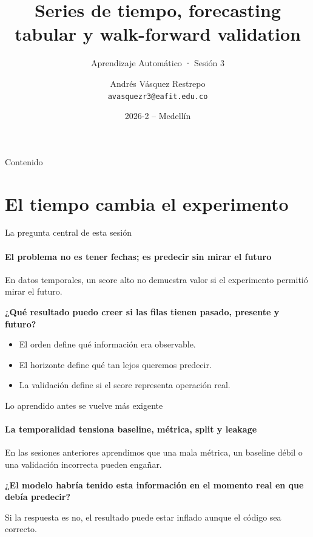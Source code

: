 \documentclass[aspectratio=169,11pt]{beamer}  %
\title[Series de tiempo, forecasting tabular y walk-forward validation]{Series de tiempo, forecasting tabular y walk-forward validation}
\subtitle{Aprendizaje Automático · Sesión 3}
\author[Aprendizaje Automático]{Andrés Vásquez Restrepo\\[2pt]{\normalfont\small\texttt{avasquezr3@eafit.edu.co}}}
\institute{SI7009 - 1 (5553)\\Universidad EAFIT}
\date{2026-2 -- Medellín}
\newcommand{\Lg}{\fontsize{16}{20}\selectfont}
\newcommand{\bigstate}[1]{\begin{center}\Lg #1\end{center}}
\newcommand{\bigq}[1]{\begin{center}\Lg\bfseries #1\end{center}}
\begin{document}
\titleframe
\setcounter{framenumber}{1}

\begin{frame}[t]{Contenido}
\vspace*{-0.3em}
{\setlength{\parskip}{0pt}\tableofcontents}
\end{frame}

\section{El tiempo cambia el experimento}

\begin{frame}{La pregunta central de esta sesión}
\framesubtitle{El problema no es tener fechas; es predecir sin mirar el futuro}
\bigstate{En datos temporales, un score alto no demuestra valor si el experimento permitió mirar el futuro.}
\vspace{0.3em}
\bigq{¿Qué resultado puedo creer si las filas tienen pasado, presente y futuro?}
\vspace{0.3em}
\begin{itemize}
\item El orden define qué información era observable.
\item El horizonte define qué tan lejos queremos predecir.
\item La validación define si el score representa operación real.
\end{itemize}
\end{frame}


\begin{frame}{Lo aprendido antes se vuelve más exigente}
\framesubtitle{La temporalidad tensiona baseline, métrica, split y leakage}
\bigstate{En las sesiones anteriores aprendimos que una mala métrica, un baseline débil o una validación incorrecta pueden engañar.}
\vspace{0.3em}
\bigq{¿El modelo habría tenido esta información en el momento real en que debía predecir?}
\vspace{0.3em}
{\Lg Si la respuesta es no, el resultado puede estar inflado aunque el código sea correcto.\par}
\end{frame}
\end{document}
